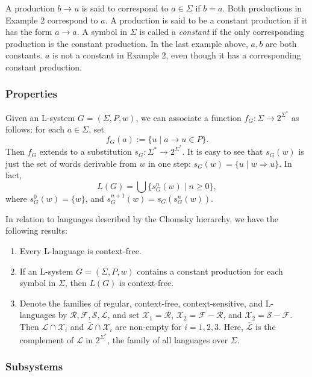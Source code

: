 \documentclass[12pt]{article}
\begin{document}
A production $b\to u$ is said to correspond to $a\in \Sigma$ if $b=a$.  Both productions in Example 2 correspond to $a$.  A production is said to be a constant production if it has the form $a\to a$.  A symbol in $\Sigma$ is called a \emph{constant} if the only corresponding production is the constant production.  In the last example above, $a,b$ are both constants.  $a$ is not a constant in Example 2, even though it has a corresponding constant production.

\subsubsection*{Properties}

Given an L-system $G=(\Sigma,P,w)$, we can associate a function $f_G:\Sigma\to 2^{\Sigma^*}$ as follows: for each $a\in \Sigma$, set $$f_G(a):=\lbrace u\mid a\to u\in P\rbrace.$$  Then $f_G$ extends to a substitution $s_G:\Sigma^*\to 2^{\Sigma^*}$.  It is easy to see that $s_G(w)$ is just the set of words derivable from $w$ in one step: $s_G(w)=\lbrace u\mid w\Rightarrow u\rbrace$.  In fact, $$L(G)=\bigcup \lbrace s_G^n(w)\mid n\ge 0\rbrace,$$ where $s_G^0(w)=\lbrace w\rbrace$, and $s_G^{n+1}(w)=s_G(s_G^n(w))$.

In relation to languages described by the Chomsky hierarchy, we have the following results:
\begin{enumerate}
\item Every L-language is context-free.
\item If an L-system $G=(\Sigma,P,w)$ contains a constant production for each symbol in $\Sigma$, then $L(G)$ is context-free.
\item Denote the families of regular, context-free, context-sensitive, and L-languages by $\mathscr{R},\mathscr{F},\mathscr{S},\mathscr{L}$, and set $\mathscr{X}_1=\mathscr{R}$, $\mathscr{X}_2=\mathscr{F}-\mathscr{R}$, and $\mathscr{X}_2=\mathscr{S}-\mathscr{F}$.  Then $\mathscr{L}\cap \mathscr{X}_i$ and $\overline{\mathscr{L}}\cap \mathscr{X}_i$ are non-empty for $i=1,2,3$.  Here, $\overline{\mathscr{L}}$ is the complement of $\mathscr{L}$ in $2^{\Sigma^*}$, the family of all languages over $\Sigma$.
\end{enumerate}

\subsubsection*{Subsystems}
\end{document}
